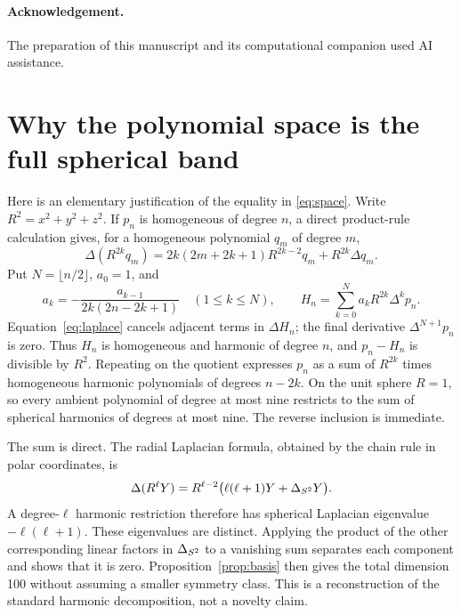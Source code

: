 \documentclass[11pt,a4paper]{article}
\begin{document}
\paragraph{Acknowledgement.}
The preparation of this manuscript and its computational companion used
AI assistance.

\appendix
\section{Why the polynomial space is the full spherical band}
\label{app:harmonics}

Here is an elementary justification of the equality in
\eqref{eq:space}. Write $R^2=x^2+y^2+z^2$. If $p_n$ is homogeneous
of degree $n$, a direct product-rule calculation gives, for a homogeneous
polynomial $q_m$ of degree $m$,
\begin{equation}\label{eq:laplace}
 \Delta(R^{2k}q_m)
 =2k(2m+2k+1)R^{2k-2}q_m+R^{2k}\Delta q_m.
\end{equation}
Put $N=\lfloor n/2\rfloor$, $a_0=1$, and
\[
 a_k=-\frac{a_{k-1}}{2k(2n-2k+1)}\quad(1\le k\le N),\qquad
 H_n=\sum_{k=0}^{N}a_kR^{2k}\Delta^k p_n.
\]
Equation~\eqref{eq:laplace} cancels adjacent terms in $\Delta H_n$;
the final derivative $\Delta^{N+1}p_n$ is zero. Thus $H_n$ is
homogeneous and harmonic of degree $n$, and $p_n-H_n$ is divisible
by $R^2$. Repeating on the quotient expresses $p_n$ as a sum of
$R^{2k}$ times homogeneous harmonic polynomials of degrees $n-2k$.
On the unit sphere $R=1$, so every ambient polynomial of degree at
most nine restricts to the sum of spherical harmonics of degrees at most
nine. The reverse inclusion is immediate.

The sum is direct. The radial Laplacian formula, obtained by the chain
rule in polar coordinates, is
\[
 \Delta(R^\ell Y)=R^{\ell-2}
   \bigl(\ell(\ell+1)Y+\Delta_{S^2}Y\bigr).
\]
A degree-$\ell$ harmonic restriction therefore has spherical Laplacian
eigenvalue $-\ell(\ell+1)$. These eigenvalues are distinct. Applying
the product of the other corresponding linear factors in
$\Delta_{S^2}$ to a vanishing sum separates each component and
shows that it is zero. Proposition~\ref{prop:basis} then gives the total
dimension 100 without assuming a smaller symmetry class. This is a
reconstruction of the standard harmonic decomposition, not a novelty claim.


{\small}
\end{document}
